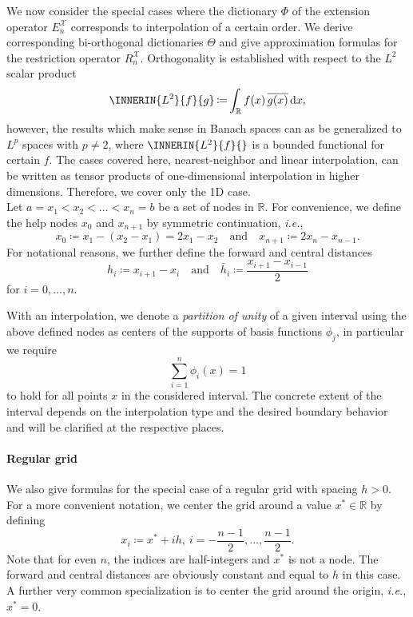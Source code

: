 \documentclass[a4paper]{paper}
\newcommand*{\SPC}[1]{{\ensuremath{\mathscr{#1}}}}
\newcommand{\RR}{{\ensuremath{\mathbb{R}}}}
\newcommand*{\EXT}[2]{\ensuremath{E_{#1}^{#2}}}
\newcommand*{\REST}[2]{\ensuremath{R_{#1}^{#2}}}
\newcommand*{\RnX}{{\ensuremath{\REST{n}{\SPC{X}}}}}
\newcommand*{\EnX}{{\ensuremath{\EXT{n}{\SPC{X}}}}}
\DeclareMathOperator{\DEFEQ}{{\coloneqq}}
\newcommand*{\CCONJ}[1]{{\ensuremath{\overline{#1}}}}
\newcommand*{\D}{{\ensuremath{\mathrm{d}}}}
\newcommand*{\ie}{\textsl{i.e.}\xspace}
\begin{document}
We now consider the special cases where the dictionary $\Phi$ of the extension operator $\EnX$ corresponds to 
interpolation of a certain order. We derive corresponding bi-orthogonal dictionaries $\Theta$ and give approximation 
formulas for the restriction operator $\RnX$. Orthogonality is established with respect to the $L^2$ scalar product
%
\begin{equation*}
 \INNERIN{L^2}{f}{g} \DEFEQ \int_\RR f(x)\, \CCONJ{g(x)}\, \D x,
\end{equation*}
%
however, the results which make sense in Banach spaces can as be generalized to $L^p$ spaces with $p \neq 2$, where 
$\INNERIN{L^2}{f}{}$ is a bounded functional for certain $f$. The cases covered here, nearest-neighbor and linear 
interpolation, can be written as tensor products of one-dimensional interpolation in higher dimensions. Therefore, we 
cover only the 1D case. \\
%
Let $a = x_1 < x_2 < \dots < x_n = b$ be a set of nodes in $\RR$. For convenience, we define the help nodes $x_0$ 
and $x_{n+1}$ by symmetric continuation, \ie,
%
\begin{equation*}
 x_0 \DEFEQ x_1 - (x_2 - x_1) = 2 x_1 - x_2
 \quad \text{and} \quad
 x_{n+1} \DEFEQ  2 x_n - x_{n-1}.
\end{equation*}
%
For notational reasons, we further define the forward and central distances
%
\begin{equation*}
 h_i \DEFEQ x_{i+1} - x_i
 \quad\text{and}\quad
 \bar h_i \DEFEQ \frac{x_{i+1} - x_{i-1}}{2}
\end{equation*}
%
for $i=0,\dots,n$.

With an interpolation, we denote a \emph{partition of unity} of a given interval using the above defined nodes as 
centers of the supports of basis functions $\phi_j$, in particular we require
%
\begin{equation*}
 \sum_{i=1}^n \phi_i(x) = 1
\end{equation*}
%
to hold for all points $x$ in the considered interval. The concrete extent of the interval depends on the interpolation 
type and the desired boundary behavior and will be clarified at the respective places.

\paragraph{Regular grid}

We also give formulas for the special case of a regular grid with spacing $h>0$. For a more convenient notation, we 
center the grid around a value $x^*\in\RR$ by defining
%
\begin{equation*}
 x_i \DEFEQ x^* + ih,\ i = -\frac{n-1}{2}, \dots, \frac{n-1}{2}.
\end{equation*}
%
Note that for even $n$, the indices are half-integers and $x^*$ is not a node. The forward and central distances are 
obviously constant and equal to $h$ in this case. A further very common specialization is to center the grid around the 
origin, \ie, $x^*=0$.
\end{document}
